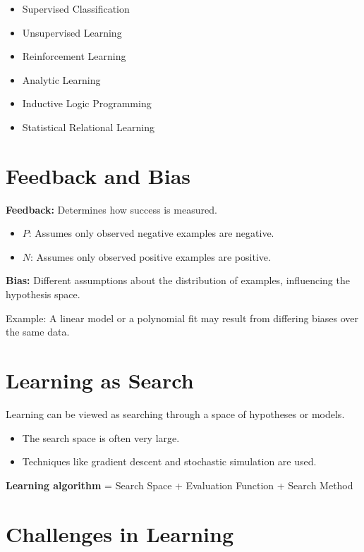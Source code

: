 \begin{itemize}
    \item Supervised Classification
    \item Unsupervised Learning
    \item Reinforcement Learning
    \item Analytic Learning
    \item Inductive Logic Programming
    \item Statistical Relational Learning
\end{itemize}

\section{Feedback and Bias}

\textbf{Feedback:} Determines how success is measured.

\begin{itemize}
    \item $P$: Assumes only observed negative examples are negative.
    \item $N$: Assumes only observed positive examples are positive.
\end{itemize}

\textbf{Bias:} Different assumptions about the distribution of examples, influencing the hypothesis space.

Example: A linear model or a polynomial fit may result from differing biases over the same data.

\section{Learning as Search}

Learning can be viewed as searching through a space of hypotheses or models.

\begin{itemize}
    \item The search space is often very large.
    \item Techniques like gradient descent and stochastic simulation are used.
\end{itemize}

\textbf{Learning algorithm} = Search Space + Evaluation Function + Search Method

\section{Challenges in Learning}

